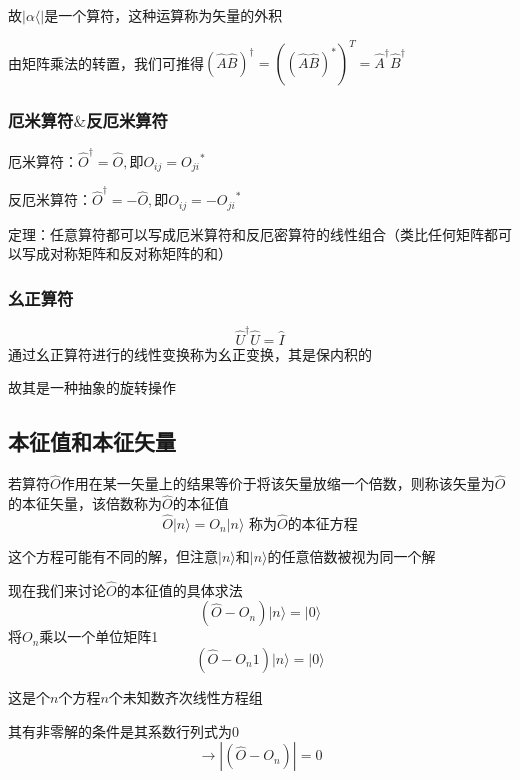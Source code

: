 \documentclass[lang=cn,10pt]{elegantbook}
\begin{document}
故$|\alpha  \langle  |$是一个算符，这种运算称为矢量的外积

由矩阵乘法的转置，我们可推得$\left( \hat{A}\hat{B} \right) ^{\dagger}=\left( \left( \hat{A}\hat{B} \right) ^* \right) ^T=\hat{A}^{\dagger}\hat{B}^{\dagger}
$
\subsubsection{厄米算符$\&$反厄米算符}

厄米算符：$\hat{O}^{\dagger}=\hat{O},\text{即}O_{ij}={O_{ji}}^*
$

反厄米算符：$\hat{O}^{\dagger}=-\hat{O},\text{即}O_{ij}=-{O_{ji}}^*$

定理：任意算符都可以写成厄米算符和反厄密算符的线性组合（类比任何矩阵都可以写成对称矩阵和反对称矩阵的和）
\subsubsection{幺正算符}

\begin{equation*}
	\hat{U}^{\dagger}\hat{U}=\hat{I}
\end{equation*}
通过幺正算符进行的线性变换称为幺正变换，其是保内积的

故其是一种抽象的旋转操作
\subsection{本征值和本征矢量}

若算符$\hat{O}$作用在某一矢量上的结果等价于将该矢量放缩一个倍数，则称该矢量为$\hat{O}$的本征矢量，该倍数称为$\hat{O}$的本征值
\begin{equation*}
	\hat{O}|n\rangle =O_n|n\rangle \,\,\text{称为}\hat{O}\text{的本征方程}
\end{equation*}

这个方程可能有不同的解，但注意$|n\rangle $和$|n\rangle $的任意倍数被视为同一个解

现在我们来讨论$\hat{O}$的本征值的具体求法
\begin{equation*}
	(\hat{O}-O_n)|n\rangle=|0\rangle
\end{equation*}
将$O_n$乘以一个单位矩阵1
\begin{equation*}
	(\hat{O}-O_n1)|n\rangle=|0\rangle
\end{equation*}

这是个$n$个方程$n$个未知数齐次线性方程组

其有非零解的条件是其系数行列式为0
\begin{equation*}
	\rightarrow|	(\hat{O}-O_n)|=0
\end{equation*}
\end{document}
